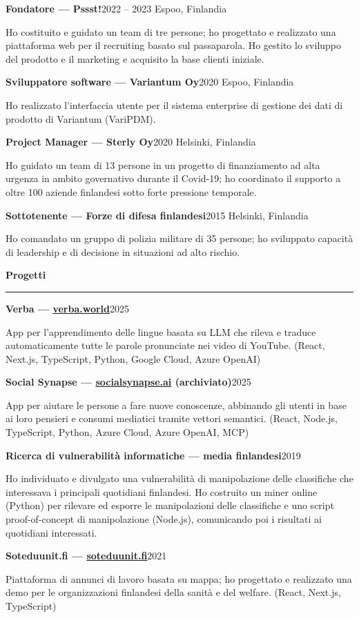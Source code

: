 \documentclass[10pt,a4paper]{article}
\newcommand{\cvsection}[1]{%
  \vspace{9pt}%
  {\textbf{#1}}\par
  \vspace{1.5pt}\hrule\vspace{5pt}}
\newcommand{\entry}[2]{%
  \needspace{3\baselineskip}%
  \vspace{4.5pt}%
  \textbf{#1}\hfill #2\par\nopagebreak\vspace{0.5pt}}
\begin{document}
\entry{Fondatore --- Pssst!}{2022 -- 2023 \textperiodcentered{} Espoo, Finlandia}
Ho costituito e guidato un team di tre persone; ho progettato e realizzato una piattaforma web per il recruiting basato sul passaparola. Ho gestito lo sviluppo del prodotto e il marketing e acquisito la base clienti iniziale.

\entry{Sviluppatore software --- Variantum Oy}{2020 \textperiodcentered{} Espoo, Finlandia}
Ho realizzato l'interfaccia utente per il sistema enterprise di gestione dei dati di prodotto di Variantum (VariPDM).

\entry{Project Manager --- Sterly Oy}{2020 \textperiodcentered{} Helsinki, Finlandia}
Ho guidato un team di 13 persone in un progetto di finanziamento ad alta urgenza in ambito governativo durante il Covid-19; ho coordinato il supporto a oltre 100 aziende finlandesi sotto forte pressione temporale.

\entry{Sottotenente --- Forze di difesa finlandesi}{2015 \textperiodcentered{} Helsinki, Finlandia}
Ho comandato un gruppo di polizia militare di 35 persone; ho sviluppato capacità di leadership e di decisione in situazioni ad alto rischio.

\cvsection{Progetti}

\entry{Verba --- \href{https://verba.world}{verba.world}}{2025}
App per l'apprendimento delle lingue basata su LLM che rileva e traduce automaticamente tutte le parole pronunciate nei video di YouTube. (React, Next.js, TypeScript, Python, Google Cloud, Azure OpenAI)

\entry{Social Synapse --- \href{https://josuakiviranta.com/socialSynapse}{socialsynapse.ai} (archiviato)}{2025}
App per aiutare le persone a fare nuove conoscenze, abbinando gli utenti in base ai loro pensieri e consumi mediatici tramite vettori semantici. (React, Node.js, TypeScript, Python, Azure Cloud, Azure OpenAI, MCP)

\entry{Ricerca di vulnerabilità informatiche --- media finlandesi}{2019}
Ho individuato e divulgato una vulnerabilità di manipolazione delle classifiche che interessava i principali quotidiani finlandesi. Ho costruito un miner online (Python) per rilevare ed esporre le manipolazioni delle classifiche e uno script proof-of-concept di manipolazione (Node.js), comunicando poi i risultati ai quotidiani interessati.

\entry{Soteduunit.fi --- \href{https://josuakiviranta.com/soteduunit}{soteduunit.fi}}{2021}
Piattaforma di annunci di lavoro basata su mappa; ho progettato e realizzato una demo per le organizzazioni finlandesi della sanità e del welfare. (React, Next.js, TypeScript)
\end{document}
